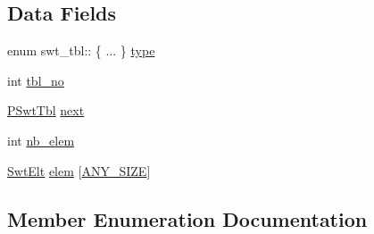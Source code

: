 \subsection*{Data Fields}
\begin{DoxyCompactItemize}
\item 
enum swt\+\_\+tbl\+:: \{ ... \}  \hyperlink{structswt__tbl_a6b1e4dc1e07f951ebe6ea23a9567e0ca}{type}
\item 
int \hyperlink{structswt__tbl_a83f05356288e3c0f11cf0539a4a64eaa}{tbl\+\_\+no}
\item 
\hyperlink{wam2ma_8c_a2a9fc1efb3dabe91f6b0bbf4662dbb1e}{P\+Swt\+Tbl} \hyperlink{structswt__tbl_aed3e3921525480876c83cfab6c82ae3b}{next}
\item 
int \hyperlink{structswt__tbl_a1f108cb255f34e0e43fd548bdeaa2a3e}{nb\+\_\+elem}
\item 
\hyperlink{wam2ma_8c_a51092a86ec70a294e13387bfc638464b}{Swt\+Elt} \hyperlink{structswt__tbl_aef5072704a328212e05d40837fe665d0}{elem} \mbox{[}\hyperlink{wam2ma_8c_a999656321ad5a5cae0669e4dd2d07ecb}{A\+N\+Y\+\_\+\+S\+I\+ZE}\mbox{]}
\end{DoxyCompactItemize}


\subsection{Member Enumeration Documentation}
